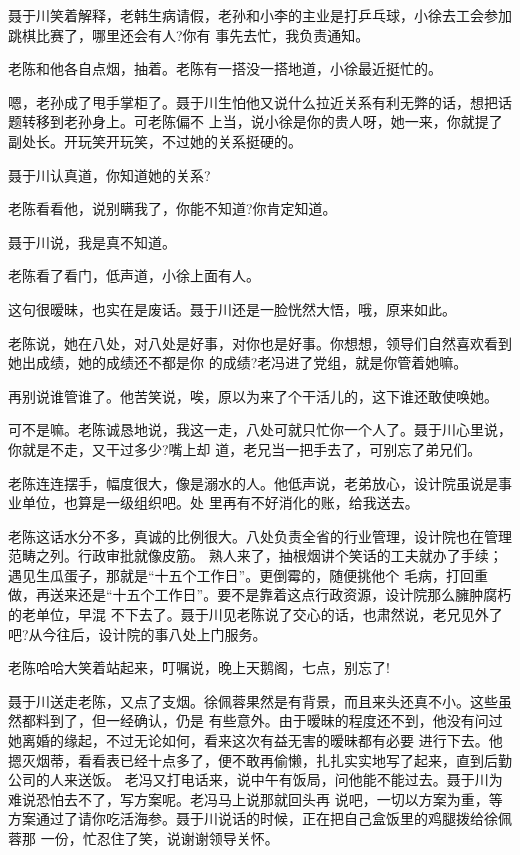 \documentclass[11pt,a4paper,onecolumn]{article}
\begin{document}
聂于川笑着解释，老韩生病请假，老孙和小李的主业是打乒乓球，小徐去工会参加跳棋比赛了，哪里还会有人?你有
事先去忙，我负责通知。

老陈和他各自点烟，抽着。老陈有一搭没一搭地道，小徐最近挺忙的。

嗯，老孙成了甩手掌柜了。聂于川生怕他又说什么拉近关系有利无弊的话，想把话题转移到老孙身上。可老陈偏不
上当，说小徐是你的贵人呀，她一来，你就提了副处长。开玩笑开玩笑，不过她的关系挺硬的。

聂于川认真道，你知道她的关系?

老陈看看他，说别瞒我了，你能不知道?你肯定知道。

聂于川说，我是真不知道。

老陈看了看门，低声道，小徐上面有人。

这句很暧昧，也实在是废话。聂于川还是一脸恍然大悟，哦，原来如此。

老陈说，她在八处，对八处是好事，对你也是好事。你想想，领导们自然喜欢看到她出成绩，她的成绩还不都是你
的成绩?老冯进了党组，就是你管着她嘛。

再别说谁管谁了。他苦笑说，唉，原以为来了个干活儿的，这下谁还敢使唤她。

可不是嘛。老陈诚恳地说，我这一走，八处可就只忙你一个人了。聂于川心里说，你就是不走，又干过多少?嘴上却
道，老兄当一把手去了，可别忘了弟兄们。

老陈连连摆手，幅度很大，像是溺水的人。他低声说，老弟放心，设计院虽说是事业单位，也算是一级组织吧。处
里再有不好消化的账，给我送去。

老陈这话水分不多，真诚的比例很大。八处负责全省的行业管理，设计院也在管理范畴之列。行政审批就像皮筋。
熟人来了，抽根烟讲个笑话的工夫就办了手续；遇见生瓜蛋子，那就是“十五个工作日”。更倒霉的，随便挑他个
毛病，打回重做，再送来还是“十五个工作日”。要不是靠着这点行政资源，设计院那么臃肿腐朽的老单位，早混
不下去了。聂于川见老陈说了交心的话，也肃然说，老兄见外了吧?从今往后，设计院的事八处上门服务。

老陈哈哈大笑着站起来，叮嘱说，晚上天鹅阁，七点，别忘了!

聂于川送走老陈，又点了支烟。徐佩蓉果然是有背景，而且来头还真不小。这些虽然都料到了，但一经确认，仍是
有些意外。由于暧昧的程度还不到，他没有问过她离婚的缘起，不过无论如何，看来这次有益无害的暧昧都有必要
进行下去。他摁灭烟蒂，看看表已经十点多了，便不敢再偷懒，扎扎实实地写了起来，直到后勤公司的人来送饭。
老冯又打电话来，说中午有饭局，问他能不能过去。聂于川为难说恐怕去不了，写方案呢。老冯马上说那就回头再
说吧，一切以方案为重，等方案通过了请你吃活海参。聂于川说话的时候，正在把自己盒饭里的鸡腿拨给徐佩蓉那
一份，忙忍住了笑，说谢谢领导关怀。
\end{document}
